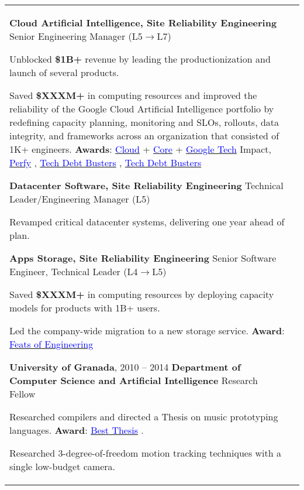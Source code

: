 \documentclass[letterpaper,10pt,oneside]{article}
\newcommand{\DatestampY}[1]{#1}
\newcommand{\itemspacing}{\vspace{0.10cm}}
\newcommand{\sref}[2]{%
    \href{https://0/local/attachments/#1}{\textcolor{blue}{#2}}%
}
\newenvironment{body}
{\par\par
\begin{longtable}{p{0.145\textwidth}p{0.81\textwidth}}}
{\par\end{longtable}\par}
\begin{document}
\begin{body}
\phantom{g}\textbf{Cloud Artificial Intelligence, Site Reliability Engineering} \textemdash{ }Senior Engineering Manager (L5$\rightarrow$L7)
\begin{comp}
\item Unblocked \textbf{\$1B+} revenue by leading the productionization and launch of several products.
\item Saved \textbf{\$XXXM+} in computing resources and improved the reliability of the Google Cloud Artificial Intelligence portfolio by redefining capacity planning, monitoring and SLOs, rollouts, data integrity, and frameworks across an organization that consisted of 1K+ engineers. \textbf{Awards}: \sref{Google-Award-GoogleCloudTechImpact-2022.pdf}{Cloud} + \sref{Google-Award-CoreTechImpact-2021.pdf}{Core} + \sref{Google-Award-GoogleTechImpact-2022.pdf}{Google Tech} Impact, \sref{Google-Award-Perfy.pdf}{Perfy}, \sref{Google-Award-TechDebtBusters1.pdf}{Tech Debt Busters}, \sref{Google-Award-TechDebtBusters2.pdf}{Tech Debt Busters}
\end{comp}
\itemspacing

\phantom{g}\textbf{Datacenter Software, Site Reliability Engineering} \textemdash{ }Technical Leader/Engineering Manager (L5)
\begin{comp}
\item Revamped critical datacenter systems, delivering one year ahead of plan. 
\end{comp}
\itemspacing

\phantom{g}\textbf{Apps Storage, Site Reliability Engineering} \textemdash{ }Senior Software Engineer, Technical Leader (L4$\rightarrow$L5)
\begin{comp}
\item Saved \textbf{\$XXXM+} in computing resources by deploying capacity models for products with 1B+ users.
\item Led the company-wide migration to a new storage service. \textbf{Award}:\hspace{0.1cm}\sref{Google-Award-FeatsOfEngineering-2018.pdf}{Feats of Engineering}
\end{comp}
\itemspacing

\textbf{University of Granada}, \DatestampY{2010} -- \DatestampY{2014} \vspace{0.06cm} \newline
\phantom{g}\textbf{Department of Computer Science and Artificial Intelligence} \textemdash{ }Research Fellow
\begin{comp}
\item Researched compilers and directed a Thesis on music prototyping languages. \textbf{Award}: \sref{UGR-Award-BestMasterThesis-MusicPrototyping.pdf}{Best Thesis}.
\item Researched 3-degree-of-freedom motion tracking techniques with a single low-budget camera.
\end{comp}


\end{body}
\end{document}
